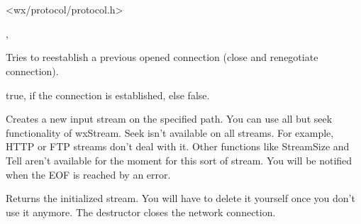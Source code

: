 \section{}\label{wxprotocol}




<wx/protocol/protocol.h>


, 



\label{wxprotocolreconnect}


Tries to reestablish a previous opened connection (close and renegotiate connection).


true, if the connection is established, else false.

\label{wxprotocolgetinput}


Creates a new input stream on the specified path. You can use all but seek
functionality of wxStream. Seek isn't available on all streams. For example,
HTTP or FTP streams don't deal with it. Other functions like StreamSize and
Tell aren't available for the moment for this sort of stream.
You will be notified when the EOF is reached by an error.


Returns the initialized stream. You will have to delete it yourself once you
don't use it anymore. The destructor closes the network connection.



\label{wxprotocolabort}

